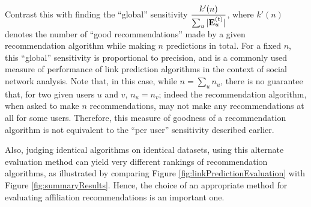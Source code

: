 \documentclass{sig-alternate}
\begin{document}
Contrast this with finding the ``global'' sensitivity $\dfrac{k'(n)}{\sum_u |\mathbf{E}_u^{(t)}|}$, where $k'(n)$ denotes the number of ``good recommendations'' made by a given recommendation algorithm while making $n$ predictions in total. For a fixed $n$, this ``global'' sensitivity is proportional to precision, and is a commonly used measure of performance of link prediction algorithms in the context of social network analysis. Note that, in this case, while $n = \sum_u n_u$, there is no guarantee that, for two given users $u$ and $v$, $n_u = n_v$; indeed the recommendation algorithm, when asked to make $n$ recommendations, may not make any recommendations at all for some users. Therefore, this measure of goodness of a recommendation algorithm is not equivalent to the ``per user'' sensitivity described earlier.

Also, judging identical algorithms on identical datasets, using this alternate evaluation method can yield very different rankings of recommendation algorithms, as illustrated by comparing Figure \ref{fig:linkPredictionEvaluation} with Figure \ref{fig:summaryResults}. Hence, the choice of an appropriate method for evaluating affiliation recommendations is an important one. 
\end{document}
